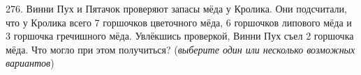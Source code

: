276. Винни Пух и Пятачок проверяют запасы мёда у Кролика. Они подсчитали, что у Кролика всего 7 горшочков цветочного мёда, 6 горшочков липового мёда и 3 горшочка гречишного мёда. Увлёкшись проверкой, Винни Пух съел 2 горшочка мёда. Что могло при этом получиться? ({\it выберите один или несколько возможных вариантов})\\
